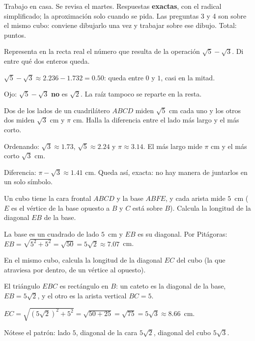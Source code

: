 \documentclass[11pt]{article}
\begin{document}
\encabezado

\begin{instrucciones}
Trabajo en casa. Se revisa el martes. Respuestas \textbf{exactas}, con el radical simplificado;
la aproximación solo cuando se pida. Las preguntas 3 y 4 son sobre el mismo cubo: conviene
dibujarlo una vez y trabajar sobre ese dibujo. Total: \totalpuntos{} puntos.
\end{instrucciones}

\begin{preguntas}

\pregunta[1] Representa en la recta real el número que resulta de la operación
$\sqrt{5} - \sqrt{3}$. Di entre qué dos enteros queda.
\begin{solucion}[3cm]
$\sqrt{5} - \sqrt{3} \approx \num{2,236} - \num{1,732} = \num{0,50}$: queda entre $0$ y $1$,
casi en la mitad.

Ojo: $\sqrt{5} - \sqrt{3}$ \textbf{no} es $\sqrt{2}$. La raíz tampoco se reparte en la resta.
\end{solucion}

\pregunta[1] Dos de los lados de un cuadrilátero $ABCD$ miden $\sqrt{5}$ cm cada uno y los
otros dos miden $\sqrt{3}$ cm y $\pi$ cm. Halla la diferencia entre el lado más largo y el más
corto.
\begin{solucion}[3.5cm]
Ordenando: $\sqrt{3} \approx \num{1,73}$, $\sqrt{5} \approx \num{2,24}$ y
$\pi \approx \num{3,14}$. El más largo mide $\pi$ cm y el más corto $\sqrt{3}$ cm.

Diferencia: $\pi - \sqrt{3} \approx \num{1,41}$ cm. Queda así, exacta: no hay manera de
juntarlos en un solo símbolo.
\end{solucion}

\pregunta[1.5] Un cubo tiene la cara frontal $ABCD$ y la base $ABFE$, y cada arista mide
$5$~cm ($E$ es el vértice de la base opuesto a $B$ y $C$ está sobre $B$). Calcula la longitud
de la diagonal $EB$ de la base.
\begin{solucion}[4cm]
La base es un cuadrado de lado $5$~cm y $EB$ es su diagonal. Por Pitágoras:
$EB = \sqrt{5^2 + 5^2} = \sqrt{50} = 5\sqrt{2} \approx \num{7,07}$~cm.
\end{solucion}

\pregunta[1.5] En el mismo cubo, calcula la longitud de la diagonal $EC$ del cubo (la que
atraviesa por dentro, de un vértice al opuesto).
\begin{solucion}[4.5cm]
El triángulo $EBC$ es rectángulo en $B$: un cateto es la diagonal de la base, $EB = 5\sqrt{2}$,
y el otro es la arista vertical $BC = 5$.

$EC = \sqrt{(5\sqrt{2})^2 + 5^2} = \sqrt{50 + 25} = \sqrt{75} = 5\sqrt{3} \approx \num{8,66}$~cm.

Nótese el patrón: lado $5$, diagonal de la cara $5\sqrt{2}$, diagonal del cubo $5\sqrt{3}$.
\end{solucion}

\end{preguntas}
\end{document}
